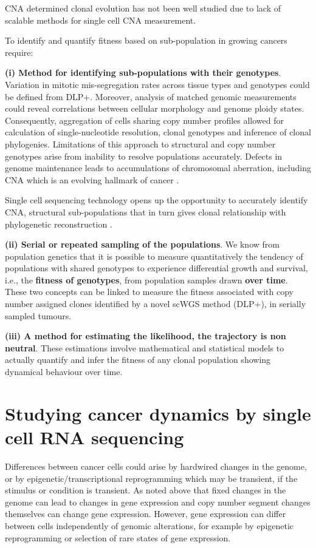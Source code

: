 CNA determined clonal evolution has not been well studied due to lack of scalable methods for single cell CNA measurement.

To identify and quantify fitness based on sub-population in growing cancers require: 

\textbf{(i) Method for identifying sub-populations with their genotypes}.
Variation in mitotic mis-segregation rates across tissue types and genotypes could be defined from DLP+. Moreover, analysis of matched genomic measurements could reveal correlations between cellular morphology and genome ploidy states. Consequently, aggregation of cells sharing copy number profiles allowed for calculation of single-nucleotide resolution, clonal genotypes and inference of clonal phylogenies.
Limitations of this approach to structural and copy number genotypes arise from inability to resolve populations accurately. Defects in genome maintenance leads to accumulations of chromosomal aberration, including \ac{CNA} which is an evolving hallmark of cancer \cite{negrini2010genomic}. 


Single cell sequencing technology opens up the opportunity to accurately identify CNA, structural sub-populations that in turn gives clonal relationship with phylogenetic reconstruction \cite{satas2020scarlet, dorri2020efficient}. 

\textbf{(ii) Serial or repeated sampling of the populations}.
We know from population genetics that it is possible to measure quantitatively the tendency of populations with shared genotypes to experience differential growth and survival, i.e., the \textbf{fitness of genotypes}, from population samples drawn \textbf{over time}.
These two concepts can be linked to measure the fitness associated with copy number assigned clones identified by a novel scWGS method (DLP+), in serially sampled tumours.

\textbf{(iii) A method for estimating the likelihood, the trajectory is non neutral}.
These estimations involve mathematical and statistical models to actually quantify and infer the fitness of any clonal population showing dynamical behaviour over time.


\section{Studying cancer dynamics by single cell RNA sequencing}

Differences between cancer cells could arise by hardwired changes in the genome, or by epigenetic/transcriptional reprogramming which may be transient, if the stimulus or condition is transient. 
As noted above that fixed changes in the genome can lead to changes in gene expression and copy number segment changes themselves can change gene expression.
However, gene expression can differ between cells independently of genomic alterations, for example by epigenetic reprogramming or selection of rare states of gene expression.

